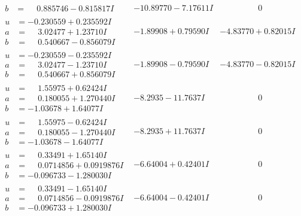 \documentclass[1p]{elsarticle_modified}
\theoremstyle{definition}
\begin{document}
$$\begin{array}{c|c|c}
\begin{aligned}
b &= \phantom{-}0.885746 - 0.815817 I\end{aligned}
 & -10.89770 - 7.17611 I & \phantom{-0.000000 } 0 \\ \hline\begin{aligned}
u &= -0.230559 + 0.235592 I \\
a &= \phantom{-}3.02477 + 1.23710 I \\
b &= \phantom{-}0.540667 - 0.856079 I\end{aligned}
 & -1.89908 + 0.79590 I & -4.83770 + 0.82015 I \\ \hline\begin{aligned}
u &= -0.230559 - 0.235592 I \\
a &= \phantom{-}3.02477 - 1.23710 I \\
b &= \phantom{-}0.540667 + 0.856079 I\end{aligned}
 & -1.89908 - 0.79590 I & -4.83770 - 0.82015 I \\ \hline\begin{aligned}
u &= \phantom{-}1.55975 + 0.62424 I \\
a &= \phantom{-}0.180055 + 1.270440 I \\
b &= -1.03678 + 1.64077 I\end{aligned}
 & -8.2935 - 11.7637 I & \phantom{-0.000000 } 0 \\ \hline\begin{aligned}
u &= \phantom{-}1.55975 - 0.62424 I \\
a &= \phantom{-}0.180055 - 1.270440 I \\
b &= -1.03678 - 1.64077 I\end{aligned}
 & -8.2935 + 11.7637 I & \phantom{-0.000000 } 0 \\ \hline\begin{aligned}
u &= \phantom{-}0.33491 + 1.65140 I \\
a &= \phantom{-}0.0714856 + 0.0919876 I \\
b &= -0.096733 - 1.280030 I\end{aligned}
 & -6.64004 + 0.42401 I & \phantom{-0.000000 } 0 \\ \hline\begin{aligned}
u &= \phantom{-}0.33491 - 1.65140 I \\
a &= \phantom{-}0.0714856 - 0.0919876 I \\
b &= -0.096733 + 1.280030 I\end{aligned}
 & -6.64004 - 0.42401 I & \phantom{-0.000000 } 0 \\ \hline\begin{aligned}

\end{aligned}
\end{array}$$
\end{document}
